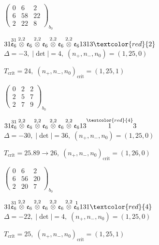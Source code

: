\documentclass[10pt]{article}
\begin{document}
\hspace{2em}$\left(\begin{smallmatrix}0 & 6 & 2 \\ 6 & 58 & 22 \\ 2 & 22 & 8\end{smallmatrix}\right)_{\!b_0}$

$31\overset{31}{\mathfrak{e}_6}\overset{2,2}{\otimes}\mathfrak{e}_6\overset{2,2}{\otimes}\mathfrak{e}_6\overset{2,2}{\otimes}\mathfrak{e}_6\overset{2,2}{\otimes}\mathfrak{e}_61313\textcolor{red}{2}$ \quad $\Delta=-3,\; |\det|=4,\; (n_+,n_-,n_0)=(1,25,0)$

\hspace{1em}$T_{\text{crit}}=24,\; (n_+,n_-,n_0)_{\text{crit}}=(1,25,1)$

\hspace{2em}$\left(\begin{smallmatrix}0 & 2 & 2 \\ 2 & 5 & 7 \\ 2 & 7 & 9\end{smallmatrix}\right)_{\!b_0}$

$31\overset{31}{\mathfrak{e}_6}\overset{2,2}{\otimes}\mathfrak{e}_6\overset{2,2}{\otimes}\mathfrak{e}_6\overset{2,2}{\otimes}\mathfrak{e}_6\overset{2,2}{\otimes}\mathfrak{e}_613\overset{\textcolor{red}{4}}{1}3$ \quad $\Delta=-30,\; |\det|=36,\; (n_+,n_-,n_0)=(1,25,0)$

\hspace{1em}$T_{\text{crit}}=25.89 \to 26,\; (n_+,n_-,n_0)_{\text{crit}}=(1,26,0)$

\hspace{2em}$\left(\begin{smallmatrix}0 & 6 & 2 \\ 6 & 56 & 20 \\ 2 & 20 & 7\end{smallmatrix}\right)_{\!b_0}$

\smallskip

$31\overset{31}{\mathfrak{e}_6}\overset{2,2}{\otimes}\mathfrak{e}_6\overset{2,2}{\otimes}\mathfrak{e}_6\overset{2,2}{\otimes}\mathfrak{e}_6\overset{2,2}{\otimes}\overset{1}{\mathfrak{e}_6}131\textcolor{red}{4}$ \quad $\Delta=-22,\; |\det|=4,\; (n_+,n_-,n_0)=(1,25,0)$

\hspace{1em}$T_{\text{crit}}=25,\; (n_+,n_-,n_0)_{\text{crit}}=(1,25,1)$
\end{document}
